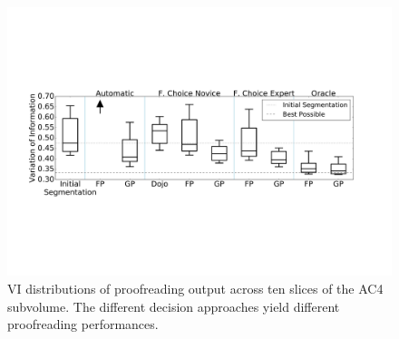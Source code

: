 \begin{figure}[t]
\begin{center}
\includegraphics[width=\linewidth]{gfx/ac4boxplot.pdf}
\end{center}
  \vspace{-4mm}
   \caption{VI distributions of proofreading output across ten slices of the AC4 subvolume. The different decision approaches yield different proofreading performances.}
\label{fig:ac4boxplot}
\end{figure}
